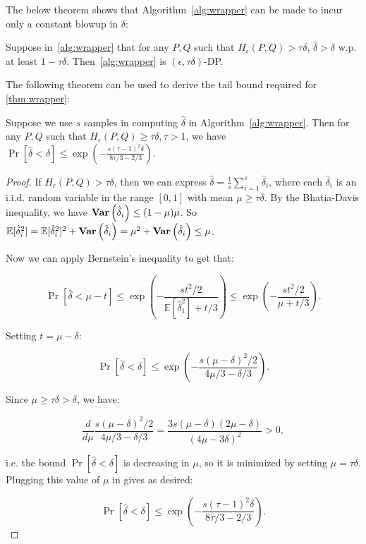 The below theorem shows that Algorithm~\ref{alg:wrapper} can be made to incur only a constant blowup in $\delta$:

\begin{theorem}
Suppose in~\cref{alg:wrapper} that for any $P, Q$ such that $H_\epsilon(P, Q) > \tau \delta$, $\hat{\delta} > \delta$ w.p. at least $1 - \tau \delta$. Then~\cref{alg:wrapper} is $(\epsilon, \tau \delta)$-DP.   
\end{theorem}\label{thm:wrapper}

The following theorem can be used to derive the tail bound required for \cref{thm:wrapper}:

\begin{theorem}\label{thm:bernstein}
Suppose we use $s$ samples in computing $\hat{\delta}$ in Algorithm~\ref{alg:wrapper}. Then for any $P, Q$ such that $H_\epsilon(P, Q) \geq \tau \delta, \tau > 1$, we have $\Pr[\hat{\delta} < \delta] \leq \exp\left(-\frac{s(\tau-1)^2\delta}{ 8\tau/3-2/3}\right).$
\end{theorem}
\begin{proof}
If $H_\epsilon(P, Q) > \tau \delta$, then we can express $\hat{\delta} = \frac{1}{s} \sum_{i=1}^s \hat{\delta}_i$, where each $\hat{\delta}_i$ is an i.i.d. random variable in the range $[0, 1]$ with mean $\mu \geq \tau \delta$. By the Bhatia-Davis inequality, we have $\mathbf{Var}\left(\hat{\delta}_i\right) \leq (1 - \mu)\mu$. So $\mathbb{E}[\hat{\delta}_i^2] = \mathbb{E}[\hat{\delta}_i^2]^2 + \mathbf{Var}\left(\hat{\delta}_i\right) = \mu^2 + \mathbf{Var}\left(\hat{\delta}_i\right) \leq \mu$.

Now we can apply Bernstein's inequality to get that:

\[\Pr[\hat{\delta} < \mu - t] \leq \exp\left(-\frac{st^2 / 2}{ \mathbb{E}[\hat{\delta}_1^2] + t/3}\right) \leq \exp\left(-\frac{st^2 / 2}{ \mu + t/3}\right).\]

Setting $t = \mu - \delta$:

\[\Pr[\hat{\delta} < \delta] \leq \exp\left(-\frac{s(\mu - \delta)^2 / 2}{ 4\mu/3 - \delta/3}\right).\]

Since $\mu \geq \tau \delta > \delta$, we have:

\[\frac{d}{d\mu} \frac{s(\mu - \delta)^2 / 2}{ 4\mu/3 - \delta/3} = \frac{3s (\mu - \delta)(2\mu - \delta)}{(4\mu - 3\delta)^2} > 0,\]

i.e. the bound $\Pr[\hat{\delta} < \delta]$ is decreasing in $\mu$, so it is minimized by setting $\mu = \tau \delta$. Plugging this value of $\mu$ in gives as desired:

\[\Pr[\hat{\delta} < \delta] \leq \exp\left(-\frac{s(\tau-1)^2\delta}{ 8\tau/3-2/3}\right).\]
\end{proof}